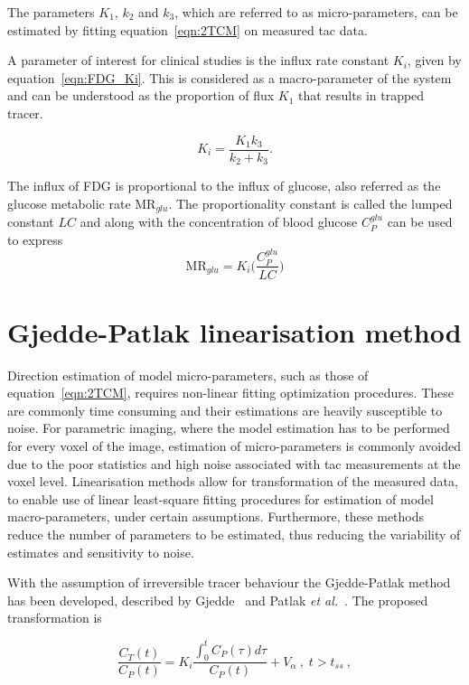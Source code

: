 The parameters $K_1$, $k_2$ and $k_3$, which are referred to as micro-parameters, can be estimated by fitting equation~\ref{eqn:2TCM} on measured \gls{tac} data. 

A parameter of interest for clinical studies is the influx rate constant $K_i$, given by equation~\ref{eqn:FDG_Ki}. This is considered as a macro-parameter of the system and can be understood as the proportion of flux $K_1$ that results in trapped tracer.

\begin{equation}
K_i = \frac{K_1 k_3}{k_2+k_3} . 
\label{eqn:FDG_Ki}
\end{equation}

The influx of FDG is proportional to the influx of glucose, also referred as the glucose metabolic rate $\textrm{MR}_{glu}$. The proportionality constant is called the lumped constant $LC$ and along with the concentration of blood glucose $C_{P}^{glu}$ can be used to express
\begin{equation}
\textrm{MR}_{glu} = K_i \Big(\frac{C_{P}^{glu}}{LC}\Big)
\label{eqn:MR_glu}
\end{equation}


\section{Gjedde-Patlak linearisation method}
Direction estimation of model micro-parameters, such as those of equation~\ref{eqn:2TCM}, requires non-linear fitting optimization procedures. These are commonly time consuming and their estimations are heavily susceptible to noise.
For parametric imaging, where the model estimation has to be performed for every voxel of the image, estimation of micro-parameters is commonly avoided due to the poor statistics and high noise associated with \gls{tac} measurements at the voxel level. 
Linearisation methods allow for transformation of the measured data, to enable use of linear least-square fitting procedures for estimation of model macro-parameters, under certain assumptions. Furthermore, these methods reduce the number of parameters to be estimated, thus reducing the variability of estimates and sensitivity to noise. 

With the assumption of irreversible tracer behaviour the Gjedde-Patlak method has been developed, described by Gjedde~\cite{Gjedde1982} and Patlak \textit{et al.}~\cite{Patlak1985}. The proposed transformation is

\begin{equation}
\label{eqn:PatlakModel}
\frac{C_{T}(t)}{C_{P}(t)} = K_i \frac{\int_{0}^{t} C_{P}(\tau) d\tau}{ C_{P}(t)} + V_{\alpha}   \ , \;  t>t_{ss} \ ,
\end{equation}

